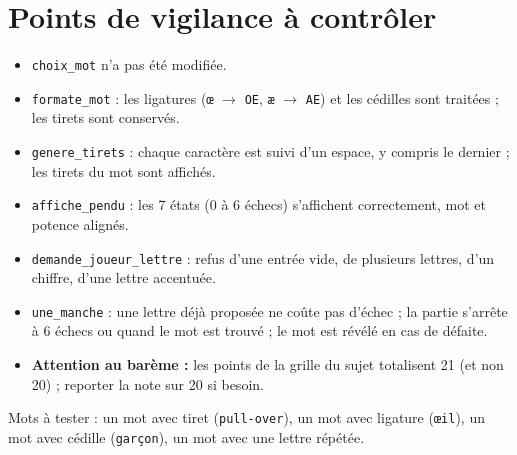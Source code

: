 \documentclass[10pt,a4paper]{article}
\begin{document}
\section*{Points de vigilance à contrôler}
\begin{itemize}
\item \texttt{choix\_\allowbreak{}mot} n'a pas été modifiée.
\item \texttt{formate\_\allowbreak{}mot} : les ligatures (\texttt{œ} $\to$ \texttt{OE}, \texttt{æ} $\to$ \texttt{AE}) et les cédilles sont traitées ; les tirets sont conservés.
\item \texttt{genere\_\allowbreak{}tirets} : chaque caractère est suivi d'un espace, y compris le dernier ; les tirets du mot sont affichés.
\item \texttt{affiche\_\allowbreak{}pendu} : les 7 états (0 à 6 échecs) s'affichent correctement, mot et potence alignés.
\item \texttt{demande\_\allowbreak{}joueur\_\allowbreak{}lettre} : refus d'une entrée vide, de plusieurs lettres, d'un chiffre, d'une lettre accentuée.
\item \texttt{une\_\allowbreak{}manche} : une lettre déjà proposée ne coûte pas d'échec ; la partie s'arrête à 6 échecs ou quand le mot est trouvé ; le mot est révélé en cas de défaite.
\item \textbf{Attention au barème :} les points de la grille du sujet totalisent 21 (et non 20) ; reporter la note sur 20 si besoin.
\end{itemize}
\smallskip
Mots à tester : un mot avec tiret (\texttt{pull-over}), un mot avec ligature (\texttt{œil}), un mot avec cédille (\texttt{garçon}), un mot avec une lettre répétée.
\end{document}

